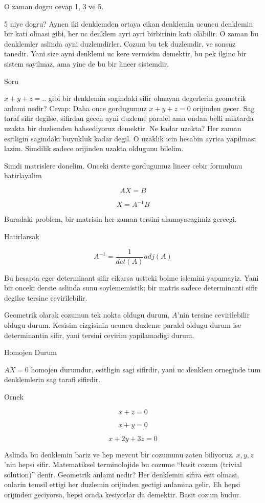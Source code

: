 \documentclass[12pt,fleqn]{article}
\begin{document}
O zaman dogru cevap 1, 3 ve 5.

5 niye dogru? Aynen iki denklemden ortaya cikan denklemin ucuncu denklemin
bir kati olmasi gibi, her uc denklem ayri ayri birbirinin kati olabilir. O
zaman bu denklemler aslinda ayni duzlemdirler. Cozum bu tek duzlemdir, ve
sonsuz tanedir. Yani size ayni denklemi uc kere vermisim demektir, bu pek
ilginc bir sistem sayilmaz, ama yine de bu bir lineer sistemdir. 

Soru

$x + y + z = ..$ gibi bir denklemin sagindaki sifir olmayan degerlerin
geometrik anlami nedir? Cevap: Daha once gordugumuz $x + y + z = 0$
orijinden gecer. Sag taraf sifir degilse, sifirdan gecen ayni duzleme
paralel ama ondan belli miktarda uzakta bir duzlemden bahsediyoruz
demektir. Ne kadar uzakta? Her zaman esitligin sagindaki buyukluk kadar
degil. O uzaklik icin hesabin ayrica yapilmasi lazim. Simdilik sadece
orijinden uzakta oldugunu bilelim. 

Simdi matrislere donelim. Onceki derste gordugumuz lineer cebir formulunu
hatirlayalim

\[ AX = B \]

\[ X = A^{-1}B \]

Buradaki problem, bir matrisin her zaman tersini alamayacagimiz gercegi. 

Hatirlarsak 

\[ A^{-1} = \frac{1}{det(A)}adj(A) \]

Bu hesapta eger determinant sifir cikarsa ustteki bolme islemini
yapamayiz. Yani bir onceki derste aslinda sunu soylememistik; bir matris
sadece determinanti sifir degilse tersine cevirilebilir. 

Geometrik olarak cozumun tek nokta oldugu durum, $A$'nin tersine
cevirilebilir oldugu durum. Kesisim cizgisinin ucuncu duzleme paralel
oldugu durum ise determinantin sifir, yani tersini cevirim yapilamadigi
durum. 

Homojen Durum

$AX = 0$ homojen durumdur, esitligin sagi sifirdir, yani uc denklem
orneginde tum denklemlerin sag tarafi sifirdir. 

Ornek

\[ x + z = 0 \]

\[ x + y = 0 \]

\[ x + 2y + 3z = 0 \]

Aslinda bu denklemin bariz ve hep mevcut bir cozumunu zaten
biliyoruz. $x,y,z$'nin hepsi sifir. Matematiksel terminolojide bu cozume
``basit cozum (trivial solution)'' denir. Geometrik anlami nedir? Her
denklemin sifira esit olmasi, onlarin temsil ettigi her duzlemin orijinden
gectigi anlamina gelir. Eh hepsi orijinden geciyorsa, hepsi orada
kesiyorlar da demektir. Basit cozum budur. 
\end{document}
